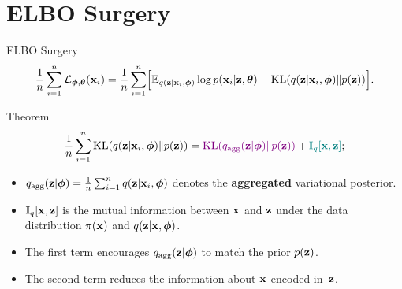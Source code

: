 \documentclass{beamer}
\begin{document}
\section{ELBO Surgery}
\begin{frame}{ELBO Surgery}
	\vspace{-0.3cm}
	\[
	    \frac{1}{n} \sum_{i=1}^n \mathcal{L}_{\boldsymbol{\phi}, \boldsymbol{\theta}}(\mathbf{x}_i) = \frac{1}{n} \sum_{i=1}^n \Bigl[ \mathbb{E}_{q(\mathbf{z} | \mathbf{x}_i, \boldsymbol{\phi})} \log p(\mathbf{x}_i | \mathbf{z}, \boldsymbol{\theta}) - \mathrm{KL}(q(\mathbf{z} | \mathbf{x}_i, \boldsymbol{\phi}) \| p(\mathbf{z})) \Bigr].
	\]
    \eqpause
	\vspace{-0.3cm}
	\begin{block}{Theorem}
		\vspace{-0.5cm}
		\[
		    \frac{1}{n} \sum_{i=1}^n \mathrm{KL}(q(\mathbf{z} | \mathbf{x}_i, \boldsymbol{\phi}) \| p(\mathbf{z})) = {\color{violet} \mathrm{KL}(q_{\text{agg}}(\mathbf{z} | \boldsymbol{\phi}) \| p(\mathbf{z}))} + {\color{teal}\mathbb{I}_{q} [\mathbf{x}, \mathbf{z}]};
		\]
        \eqpause
		\vspace{-0.5cm}
		\begin{itemize}
			\item $q_{\text{agg}}(\mathbf{z} | \boldsymbol{\phi}) = \frac{1}{n} \sum_{i=1}^n q(\mathbf{z} | \mathbf{x}_i, \boldsymbol{\phi})$ denotes the \textbf{aggregated} variational posterior.
			\item $\mathbb{I}_{q} [\mathbf{x}, \mathbf{z}]$ is the mutual information between $\mathbf{x}$ and $\mathbf{z}$ under the data distribution $\pi(\mathbf{x})$ and $q(\mathbf{z} | \mathbf{x}, \boldsymbol{\phi})$.
			\item  {\color{violet} The first term} encourages $q_{\text{agg}}(\mathbf{z} | \boldsymbol{\phi})$ to match the prior $p(\mathbf{z})$.
			\item {\color{teal} The second term} reduces the information about $\mathbf{x}$ encoded in~$\mathbf{z}$.
		\end{itemize}
	\end{block}
\end{frame}
\end{document}
